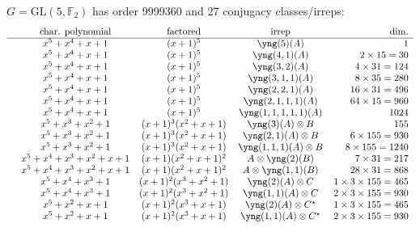 \documentclass[11pt,oneside]{article}
\newcommand{\GL}{\mathrm{GL}}
\newcommand{\Field}{\mathbb{F}}
\newcommand{\hsp}{\ \ \ \ }
\newcommand{\tensor}{\otimes}
\begin{document}
$G=\GL(5,\Field_2)$ has order 9999360 and 27 conjugacy classes/irreps:
$$
\begin{array}{ccccr}
    &             \text{char. polynomial}  &  \text{factored} & \text{irrep} & \text{dim.}  \\
\hline
    &               x^5+x^4+x+1 &                 (x+1)^5 & \yng(5)(A)                   &  1  \\
    &               x^5+x^4+x+1 &                 (x+1)^5 & \yng(4,1)(A)                 &  2\times 15=30  \\
    &               x^5+x^4+x+1 &                 (x+1)^5 & \yng(3,2)(A)                 &  4\times 31=124  \\
    &               x^5+x^4+x+1 &                 (x+1)^5 & \yng(3,1,1)(A)               &  8\times 35=280  \\
    &               x^5+x^4+x+1 &                 (x+1)^5 & \yng(2,2,1)(A)               &  16\times 31=496  \\
    &               x^5+x^4+x+1 &                 (x+1)^5 & \yng(2,1,1,1)(A)             &  64\times 15=960  \\
    &               x^5+x^4+x+1 &                 (x+1)^5 & \yng(1,1,1,1,1)(A)           &  1024  \\
    &             x^5+x^3+x^2+1 &       (x+1)^3(x^2+x+1)  & \yng(3)(A)\tensor B      &  155   \\
    &             x^5+x^3+x^2+1 &       (x+1)^3(x^2+x+1)  & \yng(2,1)(A)\tensor B        &  6\times 155=930   \\
    &             x^5+x^3+x^2+1 &       (x+1)^3(x^2+x+1)  & \yng(1,1,1)(A)\tensor B          &  \hsp 8\times 155=1240   \\
    &       x^5+x^4+x^3+x^2+x+1 &       (x+1)(x^2+x+1)^2  & A\tensor\yng(2)(B)         &  7 \times 31 = 217  \\
    &       x^5+x^4+x^3+x^2+x+1 &       (x+1)(x^2+x+1)^2  & A\tensor \yng(1,1)(B)          &  28 \times 31 = 868  \\
    &             x^5+x^4+x^3+1 &     (x+1)^2(x^3+x^2+1)  & \yng(2)(A)\tensor C        &  1 \times 3 \times 155=465   \\
    &             x^5+x^4+x^3+1 &     (x+1)^2(x^3+x^2+1)  & \yng(1,1)(A)\tensor C          &  2 \times 3 \times 155=930  \\
    &               x^5+x^2+x+1 &       (x+1)^2(x^3+x+1)  & \yng(2)(A)\tensor C^{\star}&  1 \times 3 \times 155=465   \\
    &               x^5+x^2+x+1 &       (x+1)^2(x^3+x+1)  & \yng(1,1)(A)\tensor C^{\star}  &  2 \times 3 \times 155=930   \\

\end{array}$$
\end{document}
